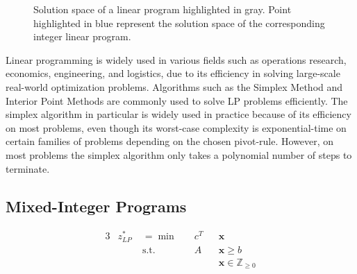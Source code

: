 \begin{figure}[ht!]
\begin{minipage}{0.45\textwidth}
			\end{minipage}
			\caption{Solution space of a linear program highlighted in gray. Point highlighted in blue represent the solution space of the corresponding integer linear program.}
			\label{fig:prelims:linear:solspace:unbounded}
		\end{figure}
		
		Linear programming is widely used in various fields such as operations research, economics, engineering, and logistics, due to its efficiency in solving large-scale real-world optimization problems. Algorithms such as the Simplex Method and Interior Point Methods are commonly used to solve LP problems efficiently.
		The simplex algorithm in particular is widely used in practice because of its efficiency on most problems, even though its worst-case complexity is exponential-time on certain families of problems depending on the chosen pivot-rule. 
		However, on most problems the simplex algorithm only takes a polynomial number of steps to terminate.
		
		\subsection{Mixed-Integer Programs}
			\begin{alignat*}{3}
				&z^*_{LP} \; &={}	\min	&\quad  c^T && \mathbf{x} \\
				&				  		& \text{s.t.} & \quad A && \mathbf{x} \geq b \\
				&						&					 &					&& \mathbf{x} \in \mathbb{Z}_{\geq 0}
			\end{alignat*}
			
